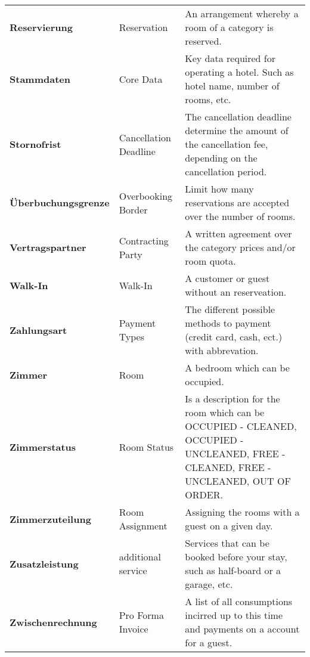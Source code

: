 \documentclass[../Pflichtenheft.tex]{subfiles}
\begin{document}
\begin{longtable}{p{4cm} p{4cm} p{6cm}}
        \textbf{Reservierung} & {Reservation} & An arrangement whereby a room of a category is reserved. \\[0.5cm]
        \textbf{Stammdaten} & {Core Data} & Key data required for operating a hotel. Such as hotel name, number of rooms, etc. \\[0.5cm]
        \textbf{Stornofrist} & {Cancellation Deadline} & The cancellation deadline determine the amount of the cancellation fee, depending on the cancellation period. \\[0.5cm]
        \textbf{Überbuchungsgrenze} & {Overbooking Border} & Limit how many reservations are accepted over the number of rooms. \\[0.5cm]
        \textbf{Vertragspartner} & {Contracting Party} & A written agreement over the category prices and/or room quota. \\[0.5cm]
        \textbf{Walk-In} & {Walk-In} & A customer or guest without an reserveation. \\[0.5cm]
        \textbf{Zahlungsart} & {Payment Types} & The different possible methods to payment (credit card, cash, ect.) with abbrevation. \\[0.5cm]
		\textbf{Zimmer} & {Room} & A bedroom which can be occupied. \\[0.5cm]
        \textbf{Zimmerstatus} & {Room Status} & Is a description for the room which can be OCCUPIED - CLEANED, OCCUPIED - UNCLEANED, FREE - CLEANED, FREE - UNCLEANED, OUT OF ORDER. \\[0.5cm]
		\textbf{Zimmerzuteilung} & {Room Assignment} & Assigning the rooms with a guest on a given day. \\[0.5cm]
        \textbf{Zusatzleistung} & {additional service} & Services that can be booked before your stay, such as half-board or a garage, etc. \\[0.5cm]
        \textbf{Zwischenrechnung} & {Pro Forma Invoice} & A list of all consumptions incirred up to this time and payments on a account for a guest. \\[0.5cm]
	\end{longtable}
\end{document}
